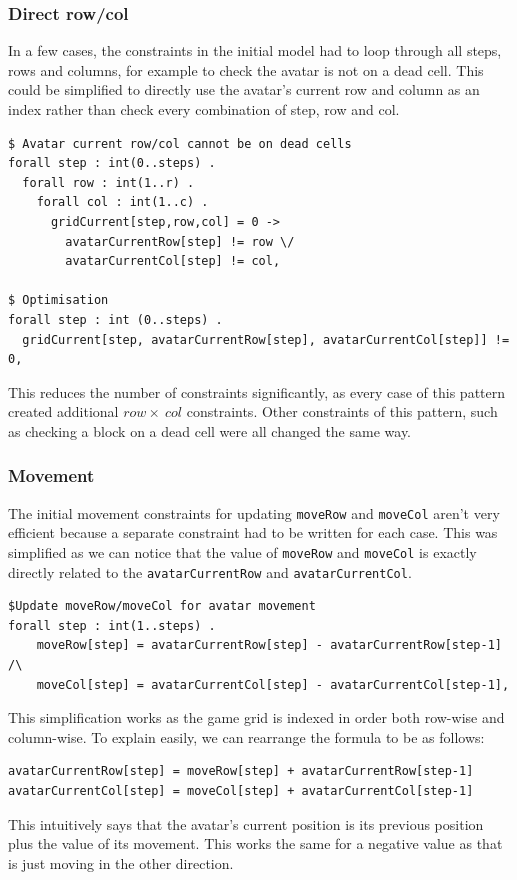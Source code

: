 \documentclass{article}
\begin{document}
\subsubsection{Direct row/col}\label{sec:improve-row}
In a few cases, the constraints in the initial model had to loop through all steps, rows and columns, for example to check the avatar is not on a dead cell. This could be simplified to directly use the avatar's current row and column as an index rather than check every combination of step, row and col.
\begin{lstlisting}[caption={Example of optimising number of constraints by directly indexing with \texttt{avatarCurrentRow} and \texttt{avatarCurrentCol}.}, captionpos=b]
$ Avatar current row/col cannot be on dead cells
forall step : int(0..steps) .
  forall row : int(1..r) .
    forall col : int(1..c) .
      gridCurrent[step,row,col] = 0 -> 
        avatarCurrentRow[step] != row \/ 
	    avatarCurrentCol[step] != col,

$ Optimisation
forall step : int (0..steps) .
  gridCurrent[step, avatarCurrentRow[step], avatarCurrentCol[step]] != 0,
\end{lstlisting}
This reduces the number of constraints significantly, as every case of this pattern created additional $row \times\ col$ constraints. Other constraints of this pattern, such as checking a block on a dead cell were all changed the same way.

\subsubsection{Movement}
The initial movement constraints for updating \texttt{moveRow} and \texttt{moveCol} aren't very efficient because a separate constraint had to be written for each case. This was simplified as we can notice that the value of \texttt{moveRow} and \texttt{moveCol} is exactly directly related to the \texttt{avatarCurrentRow} and \texttt{avatarCurrentCol}.
\begin{lstlisting}[caption={Refactored and improved movement constraint}, captionpos=b]
$Update moveRow/moveCol for avatar movement
forall step : int(1..steps) .
    moveRow[step] = avatarCurrentRow[step] - avatarCurrentRow[step-1] /\
    moveCol[step] = avatarCurrentCol[step] - avatarCurrentCol[step-1],
\end{lstlisting}
This simplification works as the game grid is indexed in order both row-wise and column-wise. To explain easily, we can rearrange the formula to be as follows:
\begin{lstlisting}
avatarCurrentRow[step] = moveRow[step] + avatarCurrentRow[step-1]
avatarCurrentCol[step] = moveCol[step] + avatarCurrentCol[step-1]
\end{lstlisting}
This intuitively says that the avatar's current position is its previous position plus the value of its movement. This works the same for a negative value as that is just moving in the other direction.
\end{document}
